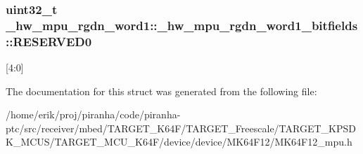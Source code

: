 \subsubsection[{\texorpdfstring{R\+E\+S\+E\+R\+V\+E\+D0}{RESERVED0}}]{\setlength{\rightskip}{0pt plus 5cm}uint32\+\_\+t \+\_\+hw\+\_\+mpu\+\_\+rgdn\+\_\+word1\+::\+\_\+hw\+\_\+mpu\+\_\+rgdn\+\_\+word1\+\_\+bitfields\+::\+R\+E\+S\+E\+R\+V\+E\+D0}\hypertarget{struct__hw__mpu__rgdn__word1_1_1__hw__mpu__rgdn__word1__bitfields_aa877b417cabc5be6dbc2c81c774816a3}{}\label{struct__hw__mpu__rgdn__word1_1_1__hw__mpu__rgdn__word1__bitfields_aa877b417cabc5be6dbc2c81c774816a3}
\mbox{[}4\+:0\mbox{]} 

The documentation for this struct was generated from the following file\+:\begin{DoxyCompactItemize}
\item 
/home/erik/proj/piranha/code/piranha-\/ptc/src/receiver/mbed/\+T\+A\+R\+G\+E\+T\+\_\+\+K64\+F/\+T\+A\+R\+G\+E\+T\+\_\+\+Freescale/\+T\+A\+R\+G\+E\+T\+\_\+\+K\+P\+S\+D\+K\+\_\+\+M\+C\+U\+S/\+T\+A\+R\+G\+E\+T\+\_\+\+M\+C\+U\+\_\+\+K64\+F/device/device/\+M\+K64\+F12/M\+K64\+F12\+\_\+mpu.\+h\end{DoxyCompactItemize}
